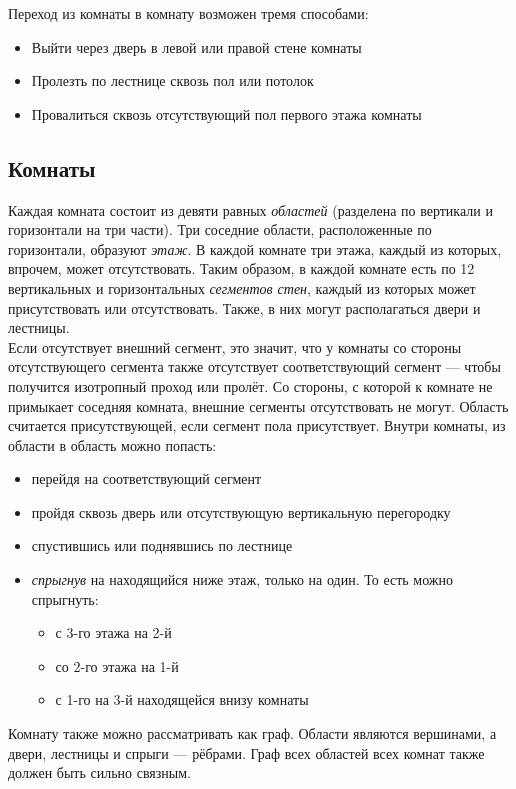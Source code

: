 \documentclass[12pt,a4paper,fullpage]{article}
\begin{document}
Переход из комнаты в комнату возможен тремя способами:
\begin{itemize}
\item Выйти через дверь в левой или правой стене комнаты
\item Пролезть по лестнице сквозь пол или потолок
\item Провалиться сквозь отсутствующий пол первого этажа комнаты\\
\end{itemize}

\subsection{Комнаты}
Каждая комната состоит из девяти равных \textit{областей} (разделена по вертикали и горизонтали на три части). Три соседние области, расположенные по горизонтали, образуют \textit{этаж}. В каждой комнате три этажа, каждый из которых, впрочем, может отсутствовать.
Таким образом, в каждой комнате есть по 12 вертикальных и горизонтальных \textit{сегментов стен}, каждый из которых может присутствовать или отсутствовать. Также, в них могут располагаться двери и лестницы.\\
Если отсутствует внешний сегмент, это значит, что у комнаты со стороны отсутствующего сегмента также отсутствует соответствующий сегмент --- чтобы получится изотропный проход или пролёт. Со стороны, с которой к комнате не примыкает соседняя комната, внешние сегменты отсутствовать не могут.
Область считается присутствующей, если сегмент пола присутствует.
Внутри комнаты, из области в область можно попасть:
\begin{itemize}
\item перейдя на соответствующий сегмент
\item пройдя сквозь дверь или отсутствующую вертикальную перегородку
\item спустившись или поднявшись по лестнице
\item \textit{спрыгнув} на находящийся ниже этаж, только на один. То есть можно спрыгнуть:
  \begin{itemize}
  \item с 3-го этажа на 2-й
  \item со 2-го этажа на 1-й
  \item с 1-го на 3-й находящейся внизу комнаты
  \end{itemize}
\end{itemize}

Комнату также можно рассматривать как граф. Области являются вершинами, а двери, лестницы и спрыги --- рёбрами. Граф всех областей всех комнат также должен быть сильно связным.\\
\end{document}
